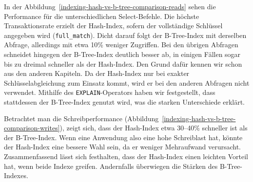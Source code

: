 In der Abbildung~\ref{indexing-hash-vs-b-tree-comparison-reads} sehen die Performance für die unterschiedlichen Select-Befehle.
Die höchste Transaktionsrate erzielt der Hash-Index, sofern der vollständige Schlüssel angegeben wird (\texttt{full\_match}).
Dicht darauf folgt der B-Tree-Index mit derselben Abfrage, allerdings mit etwa 10\% weniger Zugriffen.
Bei den übrigen Abfragen schneidet hingegen der B-Tree-Index deutlich besser ab, in einigen Fällen sogar bis zu dreimal schneller als der Hash-Index.
Den Grund dafür kennen wir schon aus den anderen Kapiteln.
Da der Hash-Index nur bei exakter Schlüsselabgleichung zum Einsatz kommt, wird er bei den anderen Abfragen nicht verwendet.
Mithilfe des \texttt{EXPLAIN}-Operators haben wir festgestellt, dass stattdessen der B-Tree-Index genutzt wird, was die starken Unterschiede erklärt.

Betrachtet man die Schreibperformance (Abbildung~\ref{indexing-hash-vs-b-tree-comparison-writes}), zeigt sich, dass der Hash-Index etwa 30--40\% schneller ist als der B-Tree-Index.
Wenn eine Anwendung also eine hohe Schreiblast hat, könnte der Hash-Index eine bessere Wahl sein, da er weniger Mehraufwand verursacht.
Zusammenfassend lässt sich festhalten, dass der Hash-Index einen leichten Vorteil hat, wenn beide Indexe greifen.
Andernfalls überwiegen die Stärken des B-Tree-Indexes.
